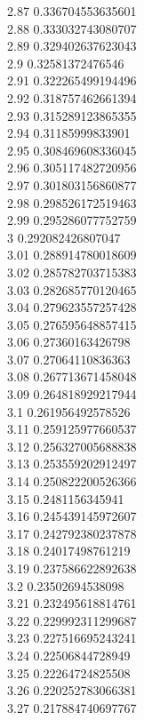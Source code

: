 {2.87	0.336704553635601\\
2.88	0.333032743080707\\
2.89	0.329402637623043\\
2.9	0.32581372476546\\
2.91	0.322265499194496\\
2.92	0.318757462661394\\
2.93	0.315289123865355\\
2.94	0.31185999833901\\
2.95	0.308469608336045\\
2.96	0.305117482720956\\
2.97	0.301803156860877\\
2.98	0.298526172519463\\
2.99	0.295286077752759\\
3	0.292082426807047\\
3.01	0.288914780018609\\
3.02	0.285782703715383\\
3.03	0.282685770120465\\
3.04	0.279623557257428\\
3.05	0.276595648857415\\
3.06	0.27360163426798\\
3.07	0.27064110836363\\
3.08	0.267713671458048\\
3.09	0.264818929217944\\
3.1	0.261956492578526\\
3.11	0.259125977660537\\
3.12	0.256327005688838\\
3.13	0.253559202912497\\
3.14	0.250822200526366\\
3.15	0.2481156345941\\
3.16	0.245439145972607\\
3.17	0.242792380237878\\
3.18	0.24017498761219\\
3.19	0.237586622892638\\
3.2	0.23502694538098\\
3.21	0.232495618814761\\
3.22	0.229992311299687\\
3.23	0.227516695243241\\
3.24	0.22506844728949\\
3.25	0.22264724825508\\
3.26	0.220252783066381\\
3.27	0.217884740697767\\
}
